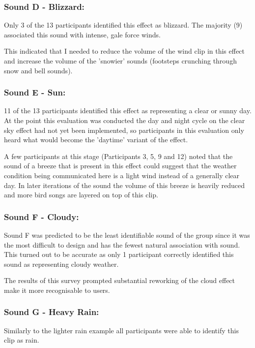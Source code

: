 \documentclass{l4proj}
\begin{document}
\subsubsection{Sound D - Blizzard:}

Only 3 of the 13 participants identified this effect as blizzard. The majority (9) associated this sound with intense, gale force winds. 

This indicated that I needed to reduce the volume of the wind clip in this effect and increase the volume of the 'snowier' sounds (footsteps crunching through snow and bell sounds).

\subsubsection{Sound E - Sun:}
11 of the 13 participants identified this effect as representing a clear or sunny day. At the point this evaluation was conducted the day and night cycle on the clear sky effect had not yet been implemented, so participants in this evaluation only heard what would become the 'daytime' variant of the effect.

A few participants at this stage (Participants 3, 5, 9 and 12) noted that the sound of a breeze that is present in this effect could suggest that the weather condition being communicated here is a light wind instead of a generally clear day. In later iterations of the sound the volume of this breeze is heavily reduced and more bird songs are layered on  top of this clip.

\subsubsection{Sound F - Cloudy:}
Sound F was predicted to be the least identifiable sound of the group since it was the most difficult to design and has the fewest natural association with sound. This turned out to be accurate as only 1 participant correctly identified this sound as representing cloudy weather.

The results of this survey prompted substantial reworking of the cloud effect make it more recognisable to users.

\subsubsection{Sound G - Heavy Rain:}

Similarly to the lighter rain example all participants were able to identify this clip as rain. 
\end{document}
